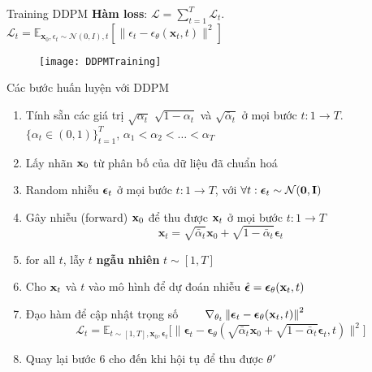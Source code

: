 \begin{frame}{Training DDPM}
	\textbf{Hàm loss}: $\mathcal{L} = \sum_{t=1}^{T} \mathcal{L}_t$. $\mathcal{L}_{t}= \mathbb{E}_{\mathbf{x}_{0}, \epsilon_t \sim \mathcal{N}(0, I), t} \left[ \| \epsilon_t - \epsilon_\theta(\mathbf{x}_t, t) \|^2 \right]$
	
	\begin{figure}
		\centering
		\texttt{[image: DDPMTraining]}
	\end{figure}
\end{frame}

\begin{frame}{Các bước huấn luyện với DDPM}
	
	\begin{enumerate}
		\item Tính sẵn các giá trị $\sqrt{\alpha_t}$ $\sqrt{1 - \alpha_t}$ và $\sqrt{\bar{\alpha}_t}$ ở mọi bước $t: 1 \rightarrow T$.
		$\{\alpha_t \in (0, 1)\}_{t=1}^T$, $\alpha_1 < \alpha_2 < \dots < \alpha_T$
		\item Lấy nhãn $\mathbf{x}_0$ từ phân bố của dữ liệu đã chuẩn hoá
		\item Random nhiễu ${\boldsymbol{\epsilon}}_t$ ở mọi bước $t: 1 \rightarrow T$, với  $\forall t:  {\boldsymbol{\epsilon}}_t \sim\mathcal{N}(\mathbf{0},\mathbf{I})$
		\item Gây nhiễu (forward) $\mathbf{x}_0$ để thu được $\mathbf{x}_t$ ở mọi bước $t: 1 \rightarrow T$
		$$
		\mathbf{x}_t = \sqrt{\bar{\alpha}_t}\mathbf{x}_0 + \sqrt{1 - \bar{\alpha}_t}\boldsymbol{\epsilon}_t
		$$
		\item $\text{for all}$ $t$, lẫy $t$ \textbf{ngẫu nhiên} $t \sim [1, T]$
		\item Cho $\mathbf{x}_t$ và $t$ vào mô hình để dự đoán nhiễu $\hat{{\boldsymbol{\epsilon}}} = {\boldsymbol{\epsilon}}_\theta(\mathbf{x}_t, t)$
		\item Đạo hàm để cập nhật trọng số $\qquad \nabla_{\theta_t} \left\| {\boldsymbol{\epsilon}}_t - {\boldsymbol{\epsilon}}_\theta(\mathbf{x}_t, t) \right\|^2$
		$$
			\mathcal{L}_t = \mathbb{E}_{t \sim [1, T], \mathbf{x}_0, \boldsymbol{\epsilon}_t} \Big[\|\boldsymbol{\epsilon}_t - \boldsymbol{\epsilon}_\theta(\sqrt{\bar{\alpha}_t}\mathbf{x}_0 + \sqrt{1 - \bar{\alpha}_t}\boldsymbol{\epsilon}_t, t)\|^2 \Big]
		$$
		\item Quay lại bước 6 cho đến khi hội tụ để thu được $\theta'$
	\end{enumerate}
\end{frame}

